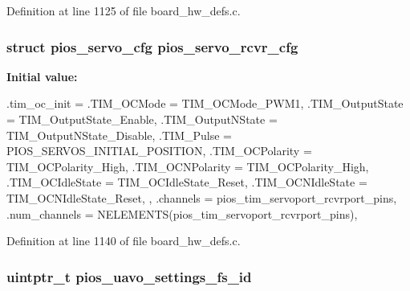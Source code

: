 \-Definition at line 1125 of file board\-\_\-hw\-\_\-defs.\-c.

\hypertarget{group___copter_control_gaa111328ef9a12c806ed1c24b93d4f663}{
\subsubsection[{pios\-\_\-servo\-\_\-rcvr\-\_\-cfg}]{\setlength{\rightskip}{0pt plus 5cm}struct {\bf pios\-\_\-servo\-\_\-cfg} {\bf pios\-\_\-servo\-\_\-rcvr\-\_\-cfg}}}\label{group___copter_control_gaa111328ef9a12c806ed1c24b93d4f663}
{\bfseries \-Initial value\-:}
\begin{DoxyCode}
 {
        .tim_oc_init = {
                .TIM_OCMode = TIM_OCMode_PWM1,
                .TIM_OutputState = TIM_OutputState_Enable,
                .TIM_OutputNState = TIM_OutputNState_Disable,
                .TIM_Pulse = PIOS_SERVOS_INITIAL_POSITION,
                .TIM_OCPolarity = TIM_OCPolarity_High,
                .TIM_OCNPolarity = TIM_OCPolarity_High,
                .TIM_OCIdleState = TIM_OCIdleState_Reset,
                .TIM_OCNIdleState = TIM_OCNIdleState_Reset,
        },
        .channels = pios_tim_servoport_rcvrport_pins,
        .num_channels = NELEMENTS(pios_tim_servoport_rcvrport_pins),
}
\end{DoxyCode}


\-Definition at line 1140 of file board\-\_\-hw\-\_\-defs.\-c.

\hypertarget{group___copter_control_gab060f441dd600b08386c0ca1b487217a}{
\subsubsection[{pios\-\_\-uavo\-\_\-settings\-\_\-fs\-\_\-id}]{\setlength{\rightskip}{0pt plus 5cm}uintptr\-\_\-t {\bf pios\-\_\-uavo\-\_\-settings\-\_\-fs\-\_\-id}}}\label{group___copter_control_gab060f441dd600b08386c0ca1b487217a}


